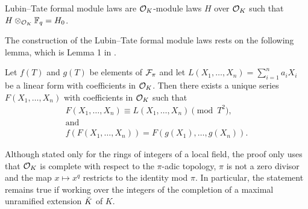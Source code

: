 \documentclass[../main.tex]{subfiles}
\begin{document}
Lubin--Tate formal module laws are $\mathcal{O}_K$-module laws $H$ over $\mathcal{O}_K$ such that 
$H \otimes_{\mathcal{O}_K} \mathbb{F}_q = H_0$. 

The construction of the Lubin--Tate formal module laws rests on the following 
lemma, which is Lemma 1 in \cite{LubinTateFormalMult}.
\begin{lem}\label{lem:LTLemma1}
  Let $f(T)$ and $g(T)$ be elements of $\mathcal{F}_\pi$ and let 
  $L(X_1, \dots, X_n) = \sum_{i=1}^n a_i X_i$ be a linear form with coefficients in 
  $\mathcal{O}_K$. Then there exists a unique series $F(X_1, \dots, X_n)$ with coefficients 
  in $\mathcal{O}_K$ such that 
  \begin{gather*}
    F(X_1, \dots, X_n) \equiv L(X_1, \dots, X_n) \pmod {T^2}, \\ \text{and} \\
    f(F(X_1, \dots, X_n)) = F(g(X_1), \dots, g(X_n)).
  \end{gather*}
\end{lem}
Although stated only for the rings of integers of a local field, the proof only
uses that $\mathcal{O}_K$ is complete with respect to the $\pi$-adic topology, $\pi$ is
not a zero divisor and the map $x \mapsto x^q$ restricts to the identity mod $\pi$.
In particular, the statement remains true if working over the integers of the
completion of a maximal unramified extension ${\breve {K}}$ of $K$.
\end{document}
